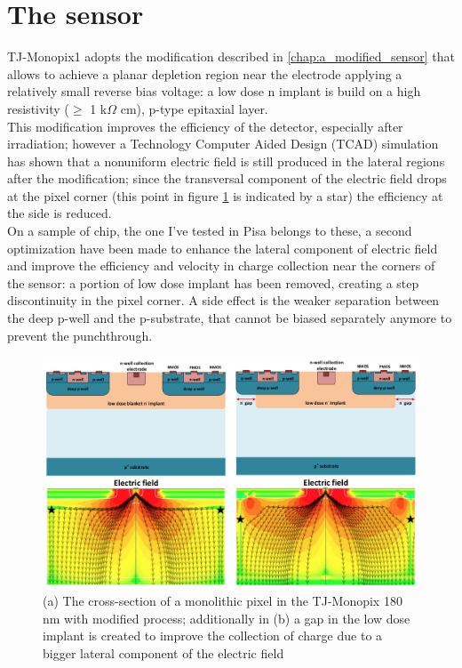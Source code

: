 \section{The sensor}
    TJ-Monopix1 adopts the modification described in \ref{chap:a_modified_sensor} that allows to achieve a planar depletion region near the electrode applying a relatively small reverse bias voltage: a low dose n implant is build on a high resistivity ($\geq $ 1 k$\Omega$ cm), p-type epitaxial layer.\\
    This modification improves the efficiency of the detector, especially after irradiation\cite{}; however a Technology Computer Aided Design (TCAD) simulation has shown that a nonuniform electric field is still produced in the lateral regions after the modification; since the transversal component of the electric field drops at the pixel corner (this point in figure \ref{fig:Monopix1_section_scheme} is indicated by a star) the efficiency at the side is reduced. \\
    On a sample of chip, the one I've tested in Pisa belongs to these, a second optimization have been made to enhance the lateral component of electric field and improve the efficiency and velocity in charge collection near the corners of the sensor: a portion of low dose implant has been removed, creating a step discontinuity in the pixel corner. 
    A side effect is the weaker separation between the deep p-well and the p-substrate, that cannot be biased separately anymore to prevent the punchthrough. 
        \begin{figure}[h!]
        \centering
        \includegraphics[width=.9\linewidth]{figures/Monopix1/Monopix1_section_scheme.png}
        \caption{(a) The cross-section of a monolithic pixel in the TJ-Monopix 180 nm with modified process; additionally in (b) a gap in the low dose implant is created to improve the collection of charge due to a bigger lateral component of the electric field}
        \label{fig:Monopix1_section_scheme}
    \end{figure}
